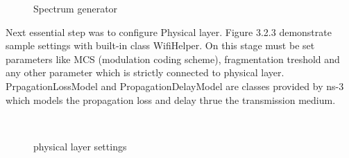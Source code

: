 \begin{center}
	\begin{figure}[!h]	
		\centering
		\caption{Spectrum generator}
	\end{figure}
\end{center}
\newpage\phantom{}	
\textnormal{\hspace{0.5cm}Next essential step was to configure Physical layer. Figure 3.2.3 demonstrate sample settings with built-in class WifiHelper. On this stage must be set parameters like MCS (modulation coding scheme), fragmentation treshold and any other parameter which is strictly connected to physical layer. PrpagationLossModel and PropagationDelayModel are  classes provided by ns-3 which models the propagation loss and delay thrue the transmission medium. }
	\begin{center}
		\begin{figure}[h]
		\centering
		\\
		\caption{physical layer settings}
		\end{figure}
	\end{center}  
